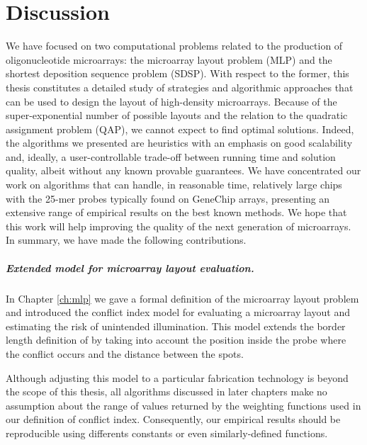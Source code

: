 \chapter{Discussion}
\label{ch:discuss}

We have focused on two computational problems related to the production of
oligonucleotide microarrays: the microarray layout problem (MLP) and the
shortest deposition sequence problem (SDSP). With respect to the former, this
thesis constitutes a detailed study of strategies and algorithmic approaches
that can be used to design the layout of high-density microarrays. Because of
the super-exponential number of possible layouts and the relation to the
quadratic assignment problem (QAP), we cannot expect to find optimal solutions.
Indeed, the algorithms we presented are heuristics with an emphasis on good
scalability and, ideally, a user-controllable trade-off between running time and
solution quality, albeit without any known provable guarantees. We have
concentrated our work on algorithms that can handle, in reasonable time,
relatively large chips with the 25-mer probes typically found on GeneChip
arrays, presenting an extensive range of empirical results on the best known
methods. We hope that this work will help improving the quality of the next
generation of microarrays. In summary, we have made the following contributions.

\paragraph{Extended model for microarray layout evaluation.} In Chapter
\ref{ch:mlp} we gave a formal definition of the microarray layout problem and
introduced the conflict index model for evaluating a microarray layout and
estimating the risk of unintended illumination. This model extends the border
length definition of \citet{Hannenhalli2002} by taking into account the position
inside the probe where the conflict occurs and the distance between the spots.

Although adjusting this model to a particular fabrication technology is beyond
the scope of this thesis, all algorithms discussed in later chapters make no
assumption about the range of values returned by the weighting functions used in
our definition of conflict index. Consequently, our empirical results should be
reproducible using differents constants or even similarly-defined functions.

